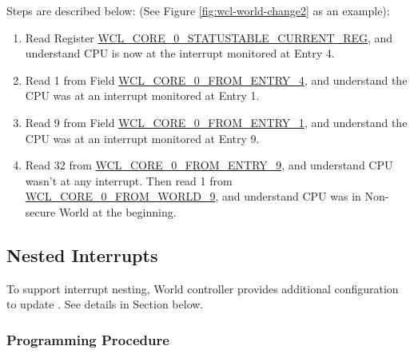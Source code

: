\documentclass[main\_\_EN.tex]{subfiles}
\begin{document}
Steps are described below: (See Figure \ref{fig:wcl-world-change2} as an example):
\begin{enumerate}
    \item Read Register \hyperref[regdesc:WCLCORE0STATUSTABLECURRENTREG]{WCL\_CORE\_0\_STATUSTABLE\_CURRENT\_REG}, and understand CPU is now at the interrupt monitored at Entry 4.
    \item  Read 1 from Field \hyperref[fielddesc:WCLCORE0FROMENTRY0]{WCL\_CORE\_0\_FROM\_ENTRY\_4}, and understand the CPU was at an interrupt monitored at Entry 1.
    \item Read 9 from Field \hyperref[fielddesc:WCLCORE0FROMENTRY0]{WCL\_CORE\_0\_FROM\_ENTRY\_1}, and understand the CPU was at an interrupt monitored at Entry 9.
    \item Read 32 from \hyperref[fielddesc:WCLCORE0FROMENTRY0]{WCL\_CORE\_0\_FROM\_ENTRY\_9}, and understand CPU wasn't at any interrupt. Then read 1 from \hyperref[fielddesc:WCLCORE0FROMWORLD0]{WCL\_CORE\_0\_FROM\_WORLD\_9}, and understand CPU was in Non-secure World at the beginning.
\end{enumerate}


\subsection{Nested Interrupts}

To support interrupt nesting, World controller provides additional configuration to update . See details in Section  below.








\subsubsection{Programming Procedure}\label{sec:wctrl-prog-step}
\end{document}
